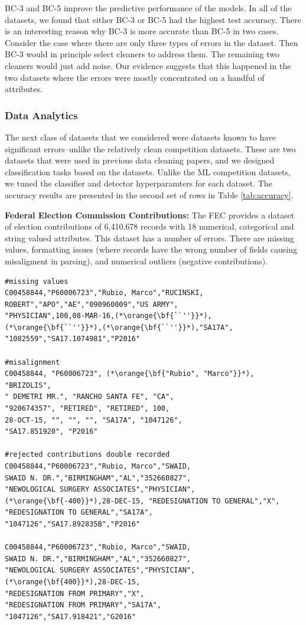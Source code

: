 BC-3 and BC-5 improve the predictive performance of the models.
In all of the datasets, we found that either BC-3 or BC-5 had the highest test accuracy.
There is an interesting reason why BC-3 is more accurate than BC-5 in two cases.
Consider the case where there are only three types of errors in the dataset.
Then BC-3 would in principle select cleaners to address them. The remaining two cleaners would just add noise.
Our evidence suggests that this happened in the two datasets where the errors were mostly concentrated on a handful of attributes.

\subsubsection{Data Analytics}
The next class of datasets that we considered were datasets known to have significant errors--unlike the relatively clean competition datasets. These are two datasets that were used in previous data cleaning papers, and we designed classification tasks based on the datasets.
Unlike the ML competition datasets, we tuned the classifier and detector hyperparamters for each dataset. 
The accuracy results are presented in the second set of rows in Table \ref{tab:accuracy}.

\vspace{0.5em}\noindent\textbf{Federal Election Commission Contributions: } The FEC provides a dataset of election contributions of 6,410,678 records with 18 numerical, categorical and string valued attributes. This dataset has a number of errors. There are missing values, formatting issues (where records have the wrong number of fields causing misaligment in parsing), and numerical outliers (negative contributions).

\begin{lstlisting}
#missing values
C00458844,"P60006723","Rubio, Marco","RUCINSKI,
ROBERT","APO","AE","090960009","US ARMY",
"PHYSICIAN",100,08-MAR-16,(*\orange{\bf{``''}}*),(*\orange{\bf{``''}}*),(*\orange{\bf{``''}}*),"SA17A",
"1082559","SA17.1074981","P2016"

#misalignment
C00458844, "P60006723", (*\orange{\bf{"Rubio", "Marco"}}*), "BRIZOLIS",
" DEMETRI MR.", "RANCHO SANTA FE", "CA", 
"920674357", "RETIRED", "RETIRED", 100, 
28-OCT-15, "", "", "", "SA17A", "1047126", 
"SA17.851920", "P2016"

#rejected contributions double recorded
C00458844,"P60006723","Rubio, Marco","SWAID, 
SWAID N. DR.","BIRMINGHAM","AL","352660827",
"NEWOLOGICAL SURGERY ASSOCIATES","PHYSICIAN",
(*\orange{\bf{-400}}*),28-DEC-15, "REDESIGNATION TO GENERAL","X",
"REDESIGNATION TO GENERAL","SA17A",
"1047126","SA17.892835B","P2016"

C00458844,"P60006723","Rubio, Marco","SWAID, 
SWAID N. DR.","BIRMINGHAM","AL","352660827",
"NEWOLOGICAL SURGERY ASSOCIATES","PHYSICIAN",
(*\orange{\bf{400}}*),28-DEC-15, 
"REDESIGNATION FROM PRIMARY","X", 
"REDESIGNATION FROM PRIMARY","SA17A",
"1047126","SA17.918421","G2016"
\end{lstlisting}

